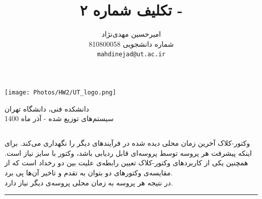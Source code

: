 \documentclass{article}
\title{تکلیف شماره ۲ - \lr{Logical Clock}}
\author{%
  امیرحسین مهدی‌نژاد\\
  شماره دانشجویی 810800058\\
  \texttt{mahdinejad@ut.ac.ir} \\
}
\begin{document}
\begin{minipage}{0.1\textwidth}%
\texttt{[image: Photos/HW2/UT\_logo.png]}
\end{minipage}%
\hfill%
\begin{minipage}{0.9\textwidth}\raggedleft
دانشکده فنی، دانشگاه تهران\\
سیستم‌های توزیع شده - 
آذر
ماه 1400\\
\end{minipage}

\makepertitle


\begin{multicols}{2}

\section{}
وکتور-کلاک آخرین زمان محلی دیده شده در فرآیندهای دیگر را نگهداری می‌کند. برای اینکه پیشرفت هر پروسه توسط پروسه‌ای قابل ردیابی باشد، وکتور با سایز
نیاز است.
همچنین یکی از کاربردهای وکتور-کلاک تعیین رابطه‌ی علیت بین دو رخداد است که از مقایسه‌ی وکتورهای دو
بتوان به تقدم و تاخیر آن‌ها پی برد.\\
در نتیجه هر پروسه به زمان محلی 
پروسه‌ی دیگر نیاز دارد.

\rule{\linewidth}{1pt}


\end{multicols}
\end{document}
